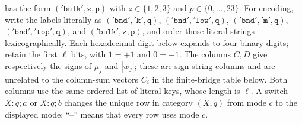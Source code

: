 has the form \(\mathtt{('bulk',z,p)}\) with \(z\in\{1,2,3\}\) and \(p\in\{0,\ldots,23\}\).
For encoding,
write the labels literally as \(\mathtt{('bnd','k',q)}\), \(\mathtt{('bnd','low',q)}\),
\(\mathtt{('bnd','m',q)}\), \(\mathtt{('bnd','top',q)}\), and
\(\mathtt{('bulk',z,p)}\), and order these literal strings lexicographically.  Each hexadecimal digit below
expands to four binary digits; retain the first \(\ell\) bits, with \(1=+1\) and \(0=-1\).
The columns \(C,D\) give respectively the signs of \(\mu_j\) and \(|w_j|\); these are sign-string
columns and are unrelated to the column-sum vectors \(C_i\) in the finite-bridge table below.
Both columns use the same ordered list of literal keys, whose length is \(\ell\).  A switch
\(X:q;a\) or \(X:q;b\) changes the unique row in category \((X,q)\) from mode \(c\)
to the displayed mode; ``--'' means that every row uses mode \(c\).
